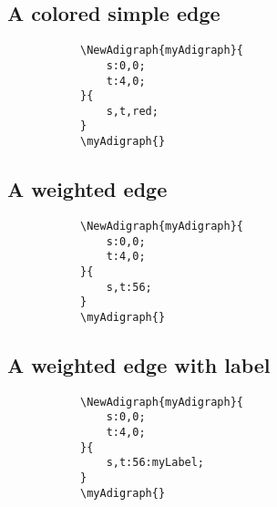 \documentclass{report}
\begin{document}
\subsection{A colored simple edge}
\begin{figure}
	\begin{subfigure}{0.49\textwidth}
		\begin{verbatim}
\NewAdigraph{myAdigraph}{
 	s:0,0;
 	t:4,0;
}{
	s,t,red;
}
\myAdigraph{}
\end{verbatim}
	\end{subfigure}
	\begin{subfigure}{0.49\textwidth}
		\myAdigraph{}
	\end{subfigure}
\end{figure}

\subsection{A weighted edge}
\begin{figure}
	\begin{subfigure}{0.49\textwidth}
		\begin{verbatim}
\NewAdigraph{myAdigraph}{
 	s:0,0;
 	t:4,0;
}{
	s,t:56;
}
\myAdigraph{}
\end{verbatim}
	\end{subfigure}
	\begin{subfigure}{0.49\textwidth}
		\myAdigraph{}
	\end{subfigure}
\end{figure}

\subsection{A weighted edge with label}
\begin{figure}
	\begin{subfigure}{0.49\textwidth}
		\begin{verbatim}
\NewAdigraph{myAdigraph}{
 	s:0,0;
 	t:4,0;
}{
	s,t:56:myLabel;
}
\myAdigraph{}
\end{verbatim}
	\end{subfigure}
	\begin{subfigure}{0.49\textwidth}
		\myAdigraph{}
	\end{subfigure}
\end{figure}
\end{document}
